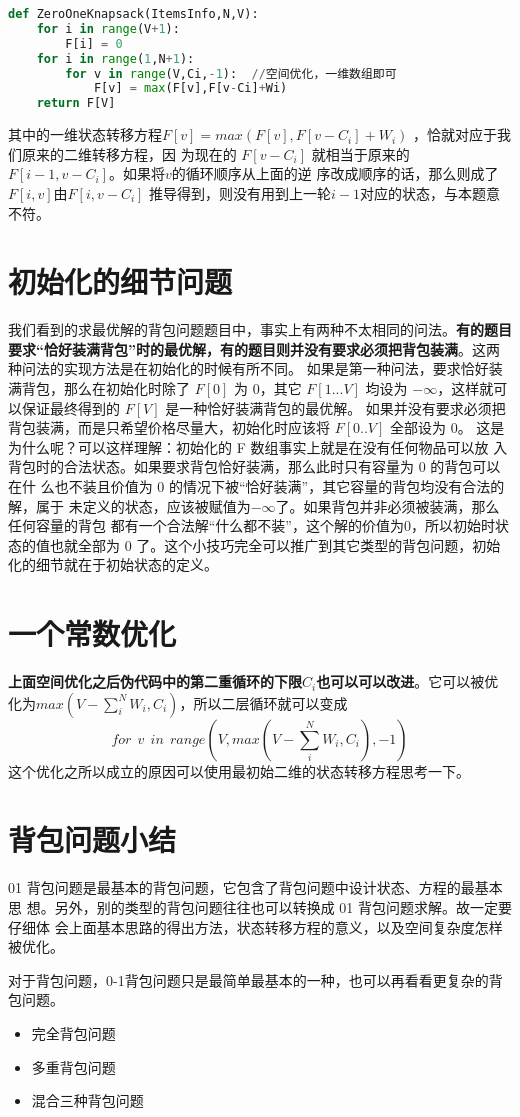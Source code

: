 \begin{lstlisting}[language=python, caption = 优化空间复杂度--二层循环倒序]
def ZeroOneKnapsack(ItemsInfo,N,V):
    for i in range(V+1):
        F[i] = 0
    for i in range(1,N+1):
        for v in range(V,Ci,-1):  //空间优化，一维数组即可
            F[v] = max(F[v],F[v-Ci]+Wi) 
    return F[V]
\end{lstlisting}

其中的一维状态转移方程$F[v] = max(F[v], F[v-C_i] + W_i)$ ，恰就对应于我们原来的二维转移方程，因
为现在的 $F[v-C_i]$ 就相当于原来的 $F[i-1, v-C_i]$。如果将$ v $的循环顺序从上面的逆
序改成顺序的话，那么则成了 $F[i, v] 由 F[i, v-C_i]$ 推导得到，则没有用到上一轮$i-1$对应的状态，与本题意不符。

\section{初始化的细节问题}
我们看到的求最优解的背包问题题目中，事实上有两种不太相同的问法。\textbf{有的题目
要求“恰好装满背包”时的最优解，有的题目则并没有要求必须把背包装满}。这两种问法的实现方法是在初始化的时候有所不同。
如果是第一种问法，要求恰好装满背包，那么在初始化时除了 $F[0]$ 为 $0$，其它
$F[1...V]$ 均设为 $-\infty$，这样就可以保证最终得到的 $F[V]$ 是一种恰好装满背包的最优解。
如果并没有要求必须把背包装满，而是只希望价格尽量大，初始化时应该将 $F[0..V]$
全部设为 $0$。
这是为什么呢？可以这样理解：初始化的 F 数组事实上就是在没有任何物品可以放
入背包时的合法状态。如果要求背包恰好装满，那么此时只有容量为 $0$ 的背包可以在什
么也不装且价值为 $0$ 的情况下被“恰好装满”，其它容量的背包均没有合法的解，属于
未定义的状态，应该被赋值为$-\infty$了。如果背包并非必须被装满，那么任何容量的背包
都有一个合法解“什么都不装”，这个解的价值为$ 0$，所以初始时状态的值也就全部为 $0$
了。这个小技巧完全可以推广到其它类型的背包问题，初始化的细节就在于初始状态的定义。

\section{一个常数优化}
\textbf{上面空间优化之后伪代码中的第二重循环的下限$C_i$也可以可以改进}。它可以被优化为$max(V-\sum_{i}^{N}W_i,C_i)$，所以二层循环就可以变成
$$
for \ \ v \ \ in \ \ range(V,max(V-\sum_{i}^{N}W_i,C_i),-1)
$$
这个优化之所以成立的原因可以使用最初始二维的状态转移方程思考一下。

\section{背包问题小结}
01 背包问题是最基本的背包问题，它包含了背包问题中设计状态、方程的最基本思
想。另外，别的类型的背包问题往往也可以转换成 01 背包问题求解。故一定要仔细体
会上面基本思路的得出方法，状态转移方程的意义，以及空间复杂度怎样被优化。

对于背包问题，0-1背包问题只是最简单最基本的一种，也可以再看看更复杂的背包问题。
\begin{itemize}
	\item 完全背包问题
	\item 多重背包问题
	\item 混合三种背包问题
\end{itemize}


